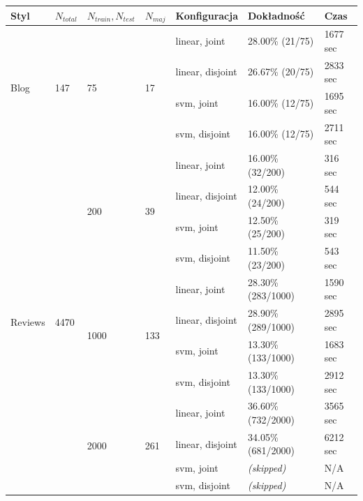 \documentclass{article}
\begin{document}
\begin{adjustwidth}{-3.5cm}{-0cm}

\begin{tabular}{|p{2cm}|p{2cm}|p{2cm}|p{2cm}|p{3cm}|p{3cm}|p{3cm}|}

\hline

\textbf{Styl} & \textbf{$N_{total}$} & \textbf{$N_{train}, N_{test}$} & $N_{maj}$ & \textbf{Konfiguracja} & \textbf{Dokładność} & \textbf{Czas} \\  \hline


\multirow{4}{*}{Blog} & \multirow{4}{*}{147}	& \multirow{4}{*}{75} & \multirow{4}{*}{17} & 
linear, joint & 28.00\% (21/75) & 1677 sec \\  \cline{5-7}
& & & & 
linear, disjoint & 26.67\% (20/75) & 2833 sec \\  \cline{5-7}
& & & & 
svm, joint & 16.00\% (12/75) & 1695 sec \\  \cline{5-7}
& & & & 
svm, disjoint & 16.00\% (12/75) & 2711 sec \\  \hline


\multirow{12}{*}{Reviews} & \multirow{12}{*}{4470} & \multirow{4}{*}{200} & \multirow{4}{*}{39} & 
linear, joint & 16.00\% (32/200) & 316 sec \\  \cline{5-7}
& & & & 
linear, disjoint & 12.00\% (24/200) & 544 sec \\  \cline{5-7}
& & & & 
svm, joint & 12.50\% (25/200) & 319 sec \\  \cline{5-7}
& & & & 
svm, disjoint & 11.50\% (23/200) & 543 sec \\  \cline{3-7}

& & \multirow{4}{*}{1000} & \multirow{4}{*}{133} & 
linear, joint & 28.30\% (283/1000) & 1590 sec \\  \cline{5-7}
& & & & 
linear, disjoint & 28.90\% (289/1000) & 2895 sec \\  \cline{5-7}
& & & & 
svm, joint & 13.30\% (133/1000) & 1683 sec \\  \cline{5-7}
& & & & 
svm, disjoint & 13.30\% (133/1000) & 2912 sec \\  \cline{3-7}

& & \multirow{4}{*}{2000} & \multirow{4}{*}{261} & 
linear, joint & 36.60\% (732/2000) & 3565 sec \\  \cline{5-7}
& & & & 
linear, disjoint & 34.05\% (681/2000) & 6212 sec \\  \cline{5-7}
& & & & 
svm, joint & \textit{(skipped)} & N/A \\  \cline{5-7}
& & & & 
svm, disjoint & \textit{(skipped)} & N/A \\  \hline



\end{tabular}
\end{adjustwidth}
\end{document}
